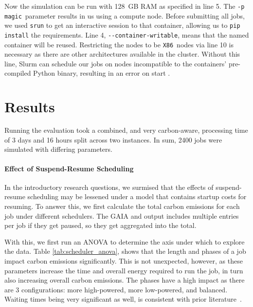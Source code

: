 Now the simulation can be run with 128~GB RAM as specified in line 5. 
The \verb|-p magic|~parameter results in us using a compute node. 
Before submitting all jobs, we used \verb|srun| to get an interactive session to that container, allowing us to \verb|pip install| the requirements.
Line 4, \verb|--container-writable|, means that the named container will be reused.
Restricting the nodes to be \verb|X86|~nodes via line 10 is necessary as there are other architectures available in the cluster. 
Without this line, Slurm can schedule our jobs on nodes incompatible to the containers' pre-compiled Python binary, resulting in an error on start .

\section{Results}

Running the evaluation took a combined, and very carbon-aware, processing time of 3 days and 16 hours split across two instances.
In sum, 2400 jobs were simulated with differing parameters. 

\paragraph{Effect of Suspend-Resume Scheduling}

In the introductory research questions, we surmised that the effects of suspend-resume scheduling may be lessened under a model that contains startup costs for resuming. 
To answer this, we first calculate the total carbon emissions for each job under different schedulers. The GAIA and \programname{} output includes multiple entries per job if they get paused, so they get aggregated into the total.

With this, we first run an ANOVA to determine the axis under which to explore the data. Table \ref{tab:scheduler_anova}, shows that the length and phases of a job impact carbon emissions significantly.
This is not unexpected, however, as these parameters increase the time and overall energy required to run the job, in turn also increasing overall carbon emissions.
The phases have a high impact as there are 3 configurations: more high-powered, more low-powered, and balanced.
Waiting times being very significant as well, is consistent with prior literature~\cite{wiesner_lets_2021}.

